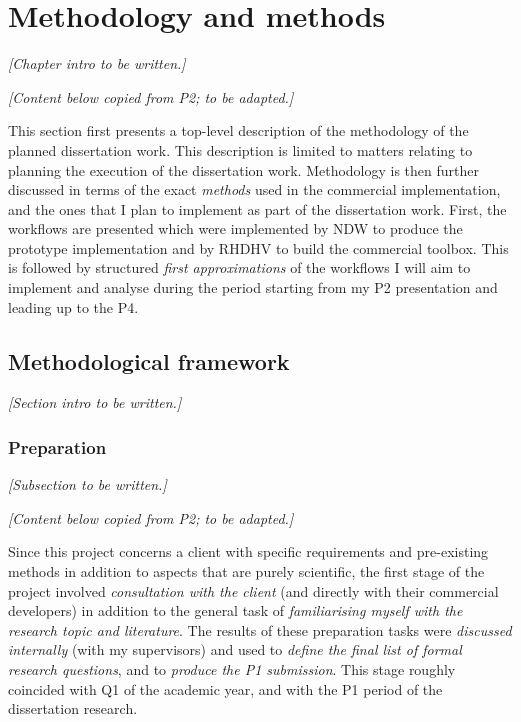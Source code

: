 
\chapter{Methodology and methods}
\label{chap:mm}

\textit{[Chapter intro to be written.]}

\textit{[Content below copied from P2; to be adapted.]}

This section first presents a top-level description of the methodology of the planned dissertation work. This description is limited to matters relating to planning the execution of the dissertation work. Methodology is then further discussed in terms of the exact \textit{methods} used in the commercial implementation, and the ones that I plan to implement as part of the dissertation work. First, the workflows are presented which were implemented by NDW to produce the prototype implementation and by RHDHV to build the commercial toolbox. This is followed by structured \textit{first approximations} of the workflows I will aim to implement and analyse during the period starting from my P2 presentation and leading up to the P4.

\section{Methodological framework}
\label{sec:methodology}

\textit{[Section intro to be written.]}

\subsection{Preparation}
\label{sub:preparation}

\textit{[Subsection to be written.]}

\textit{[Content below copied from P2; to be adapted.]}

Since this project concerns a client with specific requirements and pre-existing methods in addition to aspects that are purely scientific, the first stage of the project involved \textit{consultation with the client} (and directly with their commercial developers) in addition to the general task of \textit{familiarising myself with the research topic and literature}. The results of these preparation tasks were \textit{discussed internally} (with my supervisors) and used to \textit{define the final list of formal research questions}, and to \textit{produce the P1 submission}. This stage roughly coincided with Q1 of the academic year, and with the P1 period of the dissertation research.

